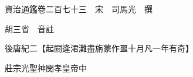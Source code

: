 










 


 
 


 

  
  
  
  
  





  
  
  
  
  
 
  

  

  
  
  



  

 
 

  
   




  

  
  


  　　資治通鑑卷二百七十三　宋　司馬光　撰

　　胡三省　音註

　　後唐紀二【起閼逢涒灘盡旃蒙作噩十月凡一年有奇】

　　莊宗光聖神閔孝皇帝中


